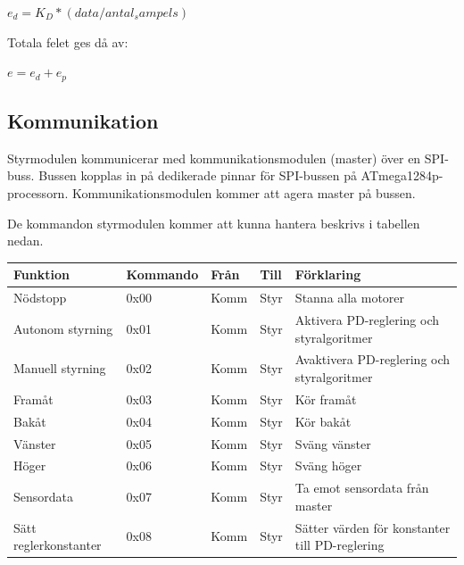 \documentclass[a4paper,12pt,fleqn]{article}
\begin{document}
$ e_d = K_{D}*(data/antal_sampels) $

Totala felet ges då av: 

$e = e_d + e_p$
\newpage



\subsection{Kommunikation}

Styrmodulen kommunicerar med kommunikationsmodulen (master) över en SPI-buss. Bussen kopplas in på dedikerade pinnar för SPI-bussen på ATmega1284p-processorn. Kommunikationsmodulen kommer att agera master på bussen. 

De kommandon styrmodulen kommer att kunna hantera beskrivs i tabellen nedan. \newline

\begin{tabular}{| p{} | p{} | p{} | p{} | p{} |}
	\hline
	\rowcolor{listinggray}
	\textbf{Funktion} & \textbf{Kommando} & \textbf{Från} & \textbf{Till} & \textbf{Förklaring} \\ \hline
	Nödstopp & 0x00 & Komm & Styr & Stanna alla motorer \\ \hline
	Autonom styrning & 0x01 & Komm & Styr & Aktivera PD-reglering och styralgoritmer \\ \hline
	Manuell styrning & 0x02 & Komm & Styr & Avaktivera PD-reglering och styralgoritmer \\ \hline
	Framåt & 0x03 & Komm & Styr & Kör framåt \\ \hline
	Bakåt & 0x04 & Komm & Styr & Kör bakåt \\ \hline
	Vänster & 0x05 & Komm & Styr & Sväng vänster \\ \hline
	Höger & 0x06 & Komm & Styr & Sväng höger \\ \hline
	Sensordata & 0x07 & Komm & Styr & Ta emot sensordata från master \\ \hline
	Sätt reglerkonstanter & 0x08 & Komm & Styr & Sätter värden för konstanter till PD-reglering \\ \hline
\end{tabular}

\newpage


\end{document}
